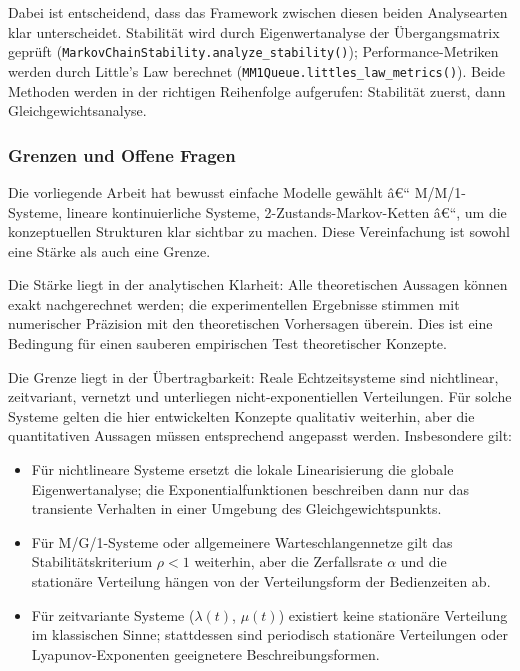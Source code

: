﻿\documentclass[a4paper,12pt]{scrreprt}
\theoremstyle{definition}
\begin{document}
Dabei ist entscheidend, dass das Framework zwischen diesen beiden Analysearten
klar unterscheidet.  Stabilität wird durch Eigenwertanalyse der
Übergangsmatrix geprüft (\texttt{MarkovChainStability.analyze\_stability()});
Performance-Metriken werden durch Little's Law berechnet
(\texttt{MM1Queue.littles\_law\_metrics()}).  Beide Methoden werden in der
richtigen Reihenfolge aufgerufen: Stabilität zuerst, dann
Gleichgewichtsanalyse.

\subsubsection{Grenzen und Offene Fragen}

Die vorliegende Arbeit hat bewusst einfache Modelle gewählt â€“ M/M/1-Systeme,
lineare kontinuierliche Systeme, 2-Zustands-Markov-Ketten â€“, um die
konzeptuellen Strukturen klar sichtbar zu machen.  Diese Vereinfachung ist
sowohl eine Stärke als auch eine Grenze.

Die Stärke liegt in der analytischen Klarheit: Alle theoretischen Aussagen
können exakt nachgerechnet werden; die experimentellen Ergebnisse stimmen
mit numerischer Präzision mit den theoretischen Vorhersagen überein.  Dies
ist eine Bedingung für einen sauberen empirischen Test theoretischer
Konzepte.

Die Grenze liegt in der Übertragbarkeit: Reale Echtzeitsysteme sind
nichtlinear, zeitvariant, vernetzt und unterliegen nicht-exponentiellen
Verteilungen.  Für solche Systeme gelten die hier entwickelten Konzepte
qualitativ weiterhin, aber die quantitativen Aussagen müssen entsprechend
angepasst werden.  Insbesondere gilt:
\begin{itemize}
	\item[-] Für nichtlineare Systeme ersetzt die lokale Linearisierung die
	globale Eigenwertanalyse; die Exponentialfunktionen beschreiben
	dann nur das transiente Verhalten in einer Umgebung des
	Gleichgewichtspunkts.
	\item[-] Für M/G/1-Systeme oder allgemeinere Warteschlangennetze
	gilt das Stabilitätskriterium $\rho < 1$ weiterhin, aber die
	Zerfallsrate $\alpha$ und die stationäre Verteilung hängen von
	der Verteilungsform der Bedienzeiten ab.
	\item[-] Für zeitvariante Systeme ($\lambda(t)$, $\mu(t)$) existiert
	keine stationäre Verteilung im klassischen Sinne; stattdessen
	sind periodisch stationäre Verteilungen oder
	Lyapunov-Exponenten geeignetere Beschreibungsformen.
\end{itemize}
\end{document}
